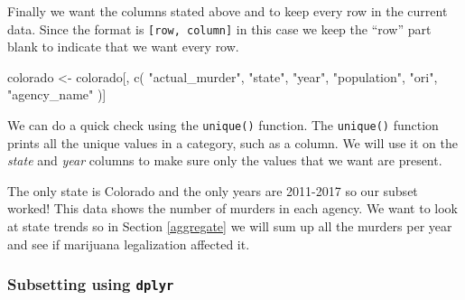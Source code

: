 \documentclass[
  a4paper,
]{krantz}
\makeatletter
\newenvironment{Shaded}{\begin{snugshade}}{\end{snugshade}}
\newcommand{\CommentTok}[1]{\textcolor[rgb]{0.37,0.37,0.37}{\textit{#1}}}
\newcommand{\FunctionTok}[1]{\textcolor[rgb]{0,0,0}{#1}}
\newcommand{\NormalTok}[1]{#1}
\newcommand{\OtherTok}[1]{\textcolor[rgb]{0.37,0.37,0.37}{#1}}
\newcommand{\SpecialCharTok}[1]{\textcolor[rgb]{0,0,0}{#1}}
\newcommand{\StringTok}[1]{\textcolor[rgb]{0.5,0.5,0.5}{#1}}
\newenvironment{kframe}{%
\medskip{}
\setlength{\fboxsep}{.8em}
 \def\at@end@of@kframe{}%
 \ifinner\ifhmode%
  \def\at@end@of@kframe{\end{minipage}}%
  \begin{minipage}{\columnwidth}%
 \fi\fi%
 \def\FrameCommand##1{\hskip\@totalleftmargin \hskip-\fboxsep
 \colorbox{shadecolor}{##1}\hskip-\fboxsep
     \hskip-\linewidth \hskip-\@totalleftmargin \hskip\columnwidth}%
 \MakeFramed {\advance\hsize-\width
   \@totalleftmargin\z@ \linewidth\hsize
   \@setminipage}}%
 {\par\unskip\endMakeFramed%
 \at@end@of@kframe}
\renewenvironment{Shaded}{\begin{kframe}}{\end{kframe}}
\makeatother
\begin{document}
Finally we want the columns stated above and to keep every
row in the current data. Since the format is
\texttt{{[}row,\ column{]}} in this case we keep the ``row''
part blank to indicate that we want every row.

\begin{Shaded}
\begin{Highlighting}[]
\NormalTok{colorado }\OtherTok{\textless{}{-}}\NormalTok{ colorado[, }\FunctionTok{c}\NormalTok{(}
  \StringTok{"actual\_murder"}\NormalTok{,}
  \StringTok{"state"}\NormalTok{,}
  \StringTok{"year"}\NormalTok{,}
  \StringTok{"population"}\NormalTok{,}
  \StringTok{"ori"}\NormalTok{,}
  \StringTok{"agency\_name"}
\NormalTok{)]}
\end{Highlighting}
\end{Shaded}

We can do a quick check using the \texttt{unique()}
function. The \texttt{unique()} function prints all the
unique values in a category, such as a column. We will use
it on the \emph{state} and \emph{year} columns to make sure
only the values that we want are present.

\begin{Shaded}
\end{Shaded}

\begin{Shaded}
\end{Shaded}

The only state is Colorado and the only years are 2011-2017
so our subset worked! This data shows the number of murders
in each agency. We want to look at state trends so in
Section \ref{aggregate} we will sum up all the murders per
year and see if marijuana legalization affected it.

\hypertarget{subsetting-using-dplyr}{%
\subsubsection{\texorpdfstring{Subsetting using
\texttt{dplyr}}{Subsetting using dplyr}}\label{subsetting-using-dplyr}}
\end{document}
